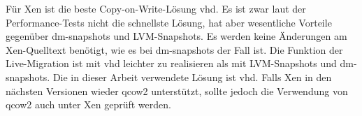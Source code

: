 Für Xen ist die beste Copy-on-Write-Lösung vhd. Es ist zwar laut der Performance-Tests nicht die schnellste Lösung, hat aber wesentliche Vorteile gegenüber dm-snapshots und LVM-Snapshots. Es werden keine Änderungen am Xen-Quelltext benötigt, wie es bei dm-snapshots der Fall ist. Die Funktion der Live-Migration ist mit vhd leichter zu realisieren als mit LVM-Snapshots und dm-snapshots. Die in dieser Arbeit verwendete Lösung ist vhd. Falls Xen in den nächsten Versionen wieder qcow2 unterstützt, sollte jedoch die Verwendung von qcow2 auch unter Xen geprüft werden. \cite{racecondition}